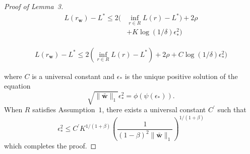 \documentclass[letterpaper]{article} %
\def\DoubleColumnEnd{}
\def\SingleColumn{}
\def\SingleColumnEnd{}
\newcommand{\weight}{\mathbf{w}}
\newcommand{\verticeweight}{\bar{\mathbf{w}}}
\newcommand{\bayeserror}{L^*}
\newcommand{\risk}{L}
\newcommand{\normo}[1]{\|#1\|_1}
\newcommand{\complexbound}{\beta}
\begin{document}
\begin{proof}[Proof of Lemma~3]
\begin{equation}
\begin{aligned}
            \risk(r_\weight{})-\bayeserror \le 2(&\inf_{r\in R}\risk(r)-\bayeserror) + 2\rho \\
            &+ K\log(1/\delta)\epsilon_*^2)
        \end{aligned}
    \end{equation}
    \DoubleColumnEnd
    \SingleColumn
    \begin{equation}
        \begin{aligned}
            \label{eq:main_result_proof_1}
            \risk(r_\weight{})-\bayeserror \le 2(\inf_{r\in R}\risk(r)-\bayeserror) + 2\rho + C\log(1/\delta)\epsilon_*^2)
        \end{aligned}
    \end{equation}
    \SingleColumnEnd
    where $C$ is a universal constant and $\epsilon_*$ is the unique positive solution of the equation
    \[\sqrt{\normo{\verticeweight{}}}\epsilon_*^2=\phi(\psi(\epsilon_*)).\]
    When $ R$ satisfies Assumption~$1$, there exists a universal constant $C^\prime$ such that
    \[\epsilon_*^2\le C^\prime K^{1/(1+\complexbound{})}(\frac{1}{(1-\complexbound{})^2\normo{\verticeweight{}}})^{1/(1+\complexbound{})}\]
    which completes the proof.
\end{proof}

\end{document}
